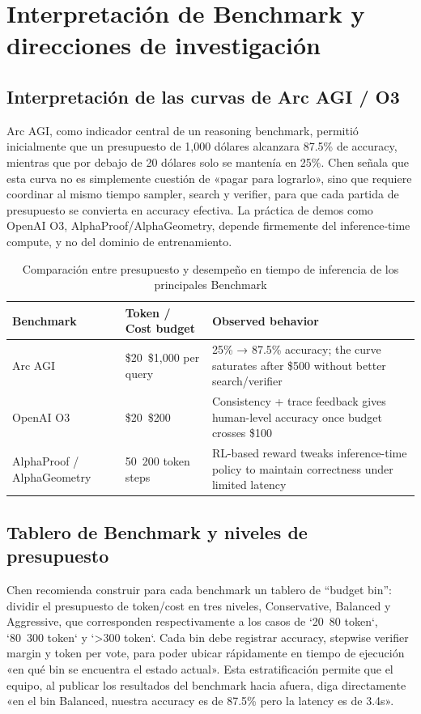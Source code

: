 \section{Interpretación de Benchmark y direcciones de investigación}

\subsection{Interpretación de las curvas de Arc AGI / O3}
Arc AGI, como indicador central de un reasoning benchmark, permitió inicialmente que un presupuesto de 1,000 dólares alcanzara 87.5\% de accuracy, mientras que por debajo de 20 dólares solo se mantenía en 25\%. Chen señala que esta curva no es simplemente cuestión de «pagar para lograrlo», sino que requiere coordinar al mismo tiempo sampler, search y verifier, para que cada partida de presupuesto se convierta en accuracy efectiva. La práctica de demos como OpenAI O3, AlphaProof/AlphaGeometry, depende firmemente del inference-time compute, y no del dominio de entrenamiento.

\begin{table}[H]
\centering
\caption{Comparación entre presupuesto y desempeño en tiempo de inferencia de los principales Benchmark}
\begin{tabular}{p{}p{}p{}}
\toprule
Benchmark & Token / Cost budget & Observed behavior \\
\midrule
Arc AGI & \$20~\$1,000 per query & 25\% → 87.5\% accuracy; the curve saturates after \$500 without better search/verifier \\
OpenAI O3 & \$20~\$200 & Consistency + trace feedback gives human-level accuracy once budget crosses \$100 \\
AlphaProof / AlphaGeometry & 50~200 token steps & RL-based reward tweaks inference-time policy to maintain correctness under limited latency \\
\bottomrule
\end{tabular}
\end{table}

\subsection{Tablero de Benchmark y niveles de presupuesto}
Chen recomienda construir para cada benchmark un tablero de ``budget bin'': dividir el presupuesto de token/cost en tres niveles, Conservative, Balanced y Aggressive, que corresponden respectivamente a los casos de `20~80 token`, `80~300 token` y `>300 token`. Cada bin debe registrar accuracy, stepwise verifier margin y token per vote, para poder ubicar rápidamente en tiempo de ejecución «en qué bin se encuentra el estado actual». Esta estratificación permite que el equipo, al publicar los resultados del benchmark hacia afuera, diga directamente «en el bin Balanced, nuestra accuracy es de 87.5\% pero la latency es de 3.4s».

